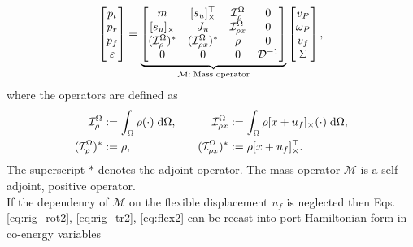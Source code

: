\begin{equation}
\label{eq:mass_op}
\begin{bmatrix}
p_t \\ p_r \\ p_f \\ \varepsilon \\
\end{bmatrix} = 
\underbrace{\begin{bmatrix}
	m & \crmat{s_u}^\top & \mathcal{I}_\rho^{\Omega} & 0 \\
	\crmat{s_u} & J_u & \mathcal{I}_{\rho x}^{\Omega} & 0  \\
	(\mathcal{I}_\rho^{\Omega})^* & (\mathcal{I}_{\rho x}^{\Omega})^* & \rho & 0  \\
	0 & 0 & 0 & {\mathcal{D}}^{-1} \\
	\end{bmatrix}}_{\mathcal{M}: \; \text{Mass operator}}
\begin{bmatrix}
v_P \\ \omega_P  \\ v_f  \\ \Sigma \\
\end{bmatrix},
\end{equation}
where the operators are defined as
\begin{equation*}
\begin{aligned}
\mathcal{I}_\rho^\Omega &:=\int_{\Omega} \rho (\cdot) \d{\Omega}, \\
(\mathcal{I}_\rho^{\Omega})^* &:= \rho, \\
\end{aligned} \qquad
\begin{aligned} 
\mathcal{I}_{\rho x}^{\Omega} &:= \int_\Omega \rho \crmat{x+u_f} (\cdot) \d{\Omega}, \\
(\mathcal{I}_{\rho x}^{\Omega})^* &:= \rho \crmat{x+u_f}^\top. \\
\end{aligned}
\end{equation*}
The superscript $*$ denotes the adjoint operator. The mass operator $\mathcal{M}$ is a self-adjoint, positive operator. \\
If the dependency of $\mathcal{M}$ on the flexible displacement $u_f$ is neglected then Eqs. \eqref{eq:rig_rot2}, \eqref{eq:rig_tr2}, \eqref{eq:flex2} can be recast into port Hamiltonian form in co-energy variables
